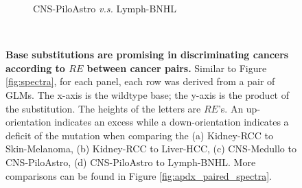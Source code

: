 \begin{figure}[ht!]
\begin{subfigure}{.5\textwidth}
    \caption{CNS-PiloAstro \textit{v.s.} Lymph-BNHL}
    \label{fig:spectra_piloastro_bnhl}
    \end{subfigure} \\
    \vspace{0.5cm}
    \caption{\textbf{Base substitutions are promising in discriminating cancers according to $RE$ between cancer pairs.} Similar to Figure \ref{fig:spectra}, for each panel, each row was derived from a pair of GLMs. The x-axis is the wildtype base; the y-axis is the product of the substitution. The heights of the letters are $RE$'s. An up-orientation indicates an excess while a down-orientation indicates a deficit of the mutation when comparing the (a) Kidney-RCC to Skin-Melanoma, (b) Kidney-RCC to Liver-HCC, (c) CNS-Medullo to CNS-PiloAstro, (d) CNS-PiloAstro to Lymph-BNHL. More comparisons can be found in Figure \ref{fig:apdx_paired_spectra}.}
    \label{fig:paired_spectra}
\end{figure}